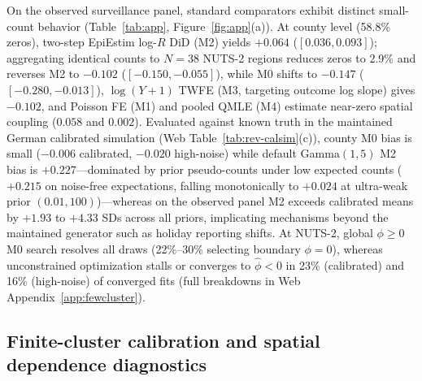 On the observed surveillance panel, standard comparators exhibit distinct small-count behavior
(Table~\ref{tab:app}, Figure~\ref{fig:app}(a)). At county level (58.8\% zeros), two-step EpiEstim
log-$R$ DiD (M2) yields $+0.064$ ($[0.036,0.093]$); aggregating identical counts to $N=38$ NUTS-2
regions reduces zeros to 2.9\% and reverses M2 to $-0.102$ ($[-0.150,-0.055]$), while M0 shifts
to $-0.147$ ($[-0.280,-0.013]$), $\log(Y+1)$ TWFE (M3, targeting outcome log slope) gives $-0.102$,
and Poisson FE (M1) and pooled QMLE (M4) estimate near-zero spatial coupling ($0.058$ and $0.002$).
Evaluated against known truth in the maintained German calibrated simulation (Web
Table~\ref{tab:rev-calsim}(c)), county M0 bias is small ($-0.006$ calibrated, $-0.020$ high-noise)
while default Gamma$(1,5)$ M2 bias is $+0.227$---dominated by prior pseudo-counts under low expected
counts ($+0.215$ on noise-free expectations, falling monotonically to $+0.024$ at ultra-weak
prior $(0.01,100)$)---whereas on the observed panel M2 exceeds calibrated means by $+1.93$ to
$+4.33$ SDs across all priors, implicating mechanisms beyond the maintained generator such as
holiday reporting shifts. At NUTS-2, global $\phi\ge 0$ M0 search resolves all draws (22\%--30\%
selecting boundary $\phi=0$), whereas unconstrained optimization stalls or converges to $\hat\phi<0$
in 23\% (calibrated) and 16\% (high-noise) of converged fits (full breakdowns in Web
Appendix~\ref{app:fewcluster}).



\subsection{Finite-cluster calibration and spatial dependence diagnostics}
\label{ss:app-wcr}

